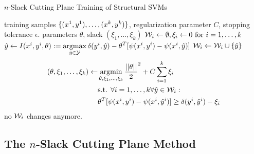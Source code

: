 \begin{algorithm*}[t]
    \caption{$n$-Slack Cutting Plane Training of Structural SVMs \label{alg_n_slack}}
    \begin{doublespacing}
    \begin{algorithmic}[1]
        \Require training samples $\{ (x^{1}, y^{1}), \dots, (x^{k}, y^{k})\}$, regularization parameter $C$, stopping tolerance $\epsilon$.
        \Ensure parameters $\theta$, slack $(\xi_1, \dotsc, \xi_k)$
        \State $\mathcal{W}_i \leftarrow \emptyset, \xi_i \leftarrow 0 \text{ for } i=1,\dots,k$
        \Repeat
                \State
                $\hat{y} \leftarrow I(x^{i}, y^{i}, \theta) := \displaystyle \operatorname*{argmax}_{\hat{y}\in\mathcal{Y}} \delta(y^{i}, \hat{y}) - \theta^T [\psi(x^{i}, y^{i}) - \psi(x^{i}, \hat{y})] $
                    \State $\mathcal{W}_i \leftarrow \mathcal{W}_i \cup \{ \hat{y}\} $
                    \State
                    \vspace{-15mm}
                    \begin{align*}
                    (\theta, \xi_1, \dots, \xi_k) \leftarrow \displaystyle &\operatorname*{argmin}_{\theta, \xi_1, \dots, \xi_k} \frac{||\theta||}{2}^2 + C \sum_{i=1}^k\xi_i\\
                    &\text{s.t. }\forall i=1,\dots,k \forall \hat{y} \in \mathcal{W}_i:\\
                    &\theta^T [\psi(x^{i}, y^{i}) - \psi(x^{i}, \hat{y}^{i})] \geq \delta(y^{i}, \hat{y}^{i}) - \xi_i
                    \end{align*}
                \EndIf
            \EndFor
            \vspace{-10mm}
            \Until no $\mathcal{W}_i$ changes anymore.
        \end{algorithmic}
    \end{doublespacing}
    \end{algorithm*}

\subsection{The $n$-Slack Cutting Plane Method}

